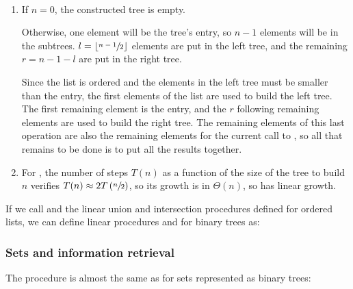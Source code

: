 \begin{exe}[2.64]
    \ \vspace{-20pt}
    \begin{enumerate}
        \item If $n = 0$, the constructed tree is empty.

            Otherwise, one element will be the tree’s entry, so $n - 1$ elements 
            will be in the subtrees.
            $l = \lfloor \sfrac{n - 1}{2}\rfloor$ elements are put in the left 
            tree, and the remaining $r = n - 1 - l$ are put in the right tree.

            Since the list is ordered and the elements in the left tree must be 
            smaller than the entry, the first elements of the list are used to 
            build the left tree. The first remaining element is the entry, and 
            the $r$ following remaining elements are used to build the right 
            tree. The remaining elements of this last operation are also the 
            remaining elements for the current call to , so 
            all that remains to be done is to put all the results together.

        \item For , the number of steps $T(n)$ as a function 
            of the size of the tree to build $n$ verifies
            $T(n) \approx 2 T\left(\sfrac{n}{2}\right)$, so its growth is in 
            $\Theta(n)$, so  has linear growth.
    \end{enumerate}
\end{exe}

\begin{exe}[2.65]
    If we call  and 
     the linear union and intersection 
    procedures defined for ordered lists, we can define linear procedures 
     and  for binary trees as:
\end{exe}

\subsubsection{Sets and information retrieval}

\begin{exe}[2.66]
    The procedure is almost the same as  for sets 
    represented as binary trees:
\end{exe}

